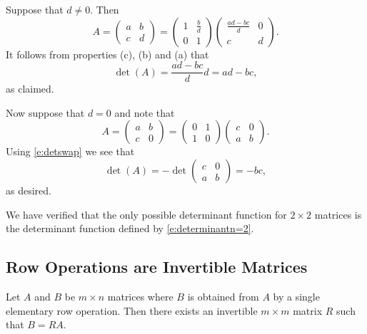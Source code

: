 \documentclass{ximera}
\begin{document}
Suppose that $d\neq 0$.  Then 
\[
A=\left(\begin{array}{cc} a & b\\c & d \end{array}\right) =
\left(\begin{array}{cc} 1 & \frac{b}{d}\\0 & 1 \end{array}\right)
\left(\begin{array}{cc} \frac{ad-bc}{d} & 0\\c & d
\end{array}\right). 
\]
It follows from properties (c), (b) and (a) that
\[
\det(A) = \frac{ad-bc}{d}d = ad-bc,
\]
as claimed.
 
Now suppose that $d=0$ and note that 
\[
A=\left(\begin{array}{cc} a & b\\c & 0 \end{array}\right) = 
\left(\begin{array}{cc} 0 & 1\\1 & 0 \end{array}\right)
\left(\begin{array}{cc} c & 0\\a & b \end{array}\right).
\]
Using \eqref{e:detswap} we see that 
\[
\det(A) = -\det \left(\begin{array}{cc} c & 0\\a & b
\end{array}\right) = -bc,
\]
as desired. 
 
We have verified that the only possible determinant function for
$2\times 2$ matrices is the determinant function defined by
\eqref{e:determinantn=2}. 
 



\subsection*{Row Operations are Invertible Matrices} 

\begin{proposition}  \label{P:ERO}
Let $A$ and $B$ be $m\times n$ matrices where $B$ is obtained from $A$ by
a single elementary row operation.  Then there exists an invertible 
$m\times m$ matrix $R$ such that $B=RA$.
\end{proposition} 
\end{document}
